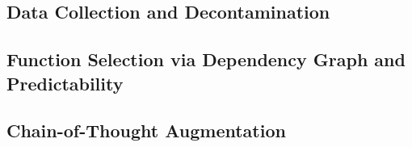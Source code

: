 \documentclass{article}
\begin{document}
\subsection{Data Collection and Decontamination}
\label{sec:method:data}



%
%
\subsection{Function Selection via Dependency Graph and Predictability}
\label{sec:method:selection}



%
%
\subsection{Chain-of-Thought Augmentation}
\label{sec:method:cot}



\end{document}
